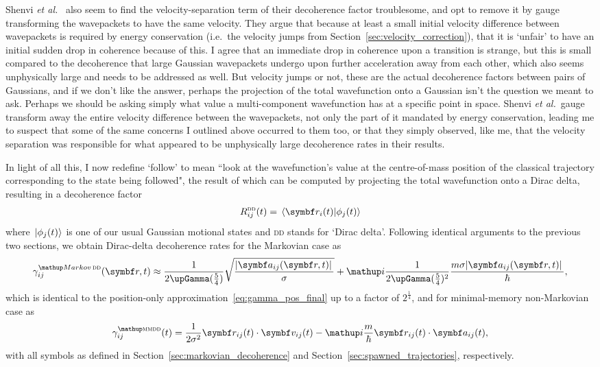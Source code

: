 Shenvi \emph{et al.}~\cite{doi:10.1063/1.3575588} also seem to find the velocity-separation term of their decoherence factor troublesome, and opt to remove it by gauge transforming the wavepackets to have the same velocity. They argue that because at least a small initial velocity difference between wavepackets is required by energy conservation (i.e.~the velocity jumps from Section~\ref{sec:velocity_correction}), that it is `unfair' to have an initial sudden drop in coherence because of this. I agree that an immediate drop in coherence upon a transition is strange, but this is small compared to the decoherence that large Gaussian wavepackets undergo upon further acceleration away from each other, which also seems unphysically large and needs to be addressed as well. But velocity jumps or not, these are the actual decoherence factors between pairs of Gaussians, and if we don't like the answer, perhaps the projection of the total wavefunction onto a Gaussian isn't the question we meant to ask. Perhaps we should be asking simply what value a multi-component wavefunction has at a specific point in space. Shenvi \emph{et al.}~gauge transform away the entire velocity difference between the wavepackets, not only the part of it mandated by energy conservation, leading me to suspect that some of the same concerns I outlined above occurred to them too, or that they simply observed, like me, that the velocity separation was responsible for what appeared to be unphysically large decoherence rates in their results.

In light of all this, I now redefine `follow' to mean ``look at the wavefunction's value at the centre-of-mass position of the classical trajectory corresponding to the state being followed", the result of which can be computed by projecting the total wavefunction onto a Dirac delta, resulting in a decoherence factor
\begin{align}
R^{\textsc{dd}}_{ij}(t) = \braket{\vec r_i(t)}{\phi_j(t)}
\end{align}
where $\ket{\phi_j(t)}$ is one of our usual Gaussian motional states and \textsc{dd} stands for `Dirac delta'. Following identical arguments to the previous two sections, we obtain Dirac-delta decoherence rates for the Markovian case as
\begin{align}\label{eq:markovian_decoherence_rate_dd}
\gamma^\up{Markov\,\textsc{dd}}_{ij}(\vec r, t) \approx \frac1{2\upGamma(\frac54)}\sqrt{\frac{\abs{\vec a_{ij}(\vec r, t)}}{\sigma}} + \ii\frac1{2\upGamma(\frac54)^2}\frac{m\sigma\abs{\vec a_{ij}(\vec r, t)}}{\hbar},
\end{align}
which is identical to the position-only approximation~\eqref{eq:gamma_pos_final} up to a factor of $2^{\frac14}$, and for minimal-memory non-Markovian case as 
\begin{align}\label{eq:minimal_memory_decoherence_rate_dd}
\gamma^\up{\textsc{mmdd}}_{ij}(t) = \frac1{2\sigma^2}\vec r_{ij}(t)\cdot\vec v_{ij}(t)
                        - \ii \frac m\hbar\vec r_{ij}(t)\cdot \vec a_{ij}(t),
\end{align}
with all symbols as defined in Section~\ref{sec:markovian_decoherence} and Section~\ref{sec:spawned_trajectories}, respectively.

